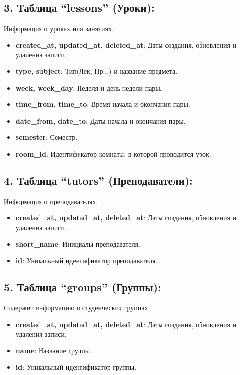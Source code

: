 \subsection*{3. Таблица ``lessons'' (Уроки):}
Информация о уроках или занятиях.
\begin{itemize}
    \item \textbf{created\_at, updated\_at, deleted\_at}: Даты создания,
обновления и удаления записи.
    \item \textbf{type, subject}: Тип(Лек, Пр...) и название предмета.
    \item \textbf{week, week\_day}: Неделя и день недели пары.
    \item \textbf{time\_from, time\_to}: Время начала и окончания пары.
    \item \textbf{date\_from, date\_to}: Даты начала и окончания пары.
    \item \textbf{semester}: Семестр.
    \item \textbf{room\_id}: Идентификатор комнаты, в которой проводится урок.
\end{itemize}

\subsection*{4. Таблица ``tutors'' (Преподаватели):}
Информация о преподавателях.
\begin{itemize}
    \item \textbf{created\_at, updated\_at, deleted\_at}: Даты создания,
обновления и удаления записи.
    \item \textbf{short\_name}: Инициалы преподавателя.
    \item \textbf{id}: Уникальный идентификатор преподавателя.
\end{itemize}

\subsection*{5. Таблица ``groups'' (Группы):}
Содержит информацию о студенческих группах.
\begin{itemize}
    \item \textbf{created\_at, updated\_at, deleted\_at}: Даты создания,
обновления и удаления записи.
    \item \textbf{name}: Название группы.
    \item \textbf{id}: Уникальный идентификатор группы.
\end{itemize}

